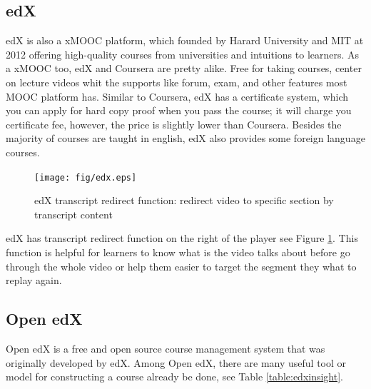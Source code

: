 \subsection{edX}
edX \cite{edx} is also a xMOOC platform, which founded by Harard University and MIT at 2012 offering high-quality courses from universities and intuitions to learners.
As a xMOOC too, edX and Coursera are pretty alike. Free for taking courses, center on lecture videos whit the supports like forum, exam, and other features most MOOC platform has.
Similar to Coursera, edX has a certificate system, which you can apply for hard copy proof when you pass the course; it will charge you certificate fee, however, the price is slightly lower than Coursera.
Besides the majority of courses are taught in english, edX also provides some foreign language courses.
\begin{figure}[H]
    \centering
    \texttt{[image: fig/edx.eps]}
    \caption{edX transcript redirect function: redirect video to specific section by transcript content}
    \label{fig:edx}
\end{figure}
edX has transcript redirect function on the right of the player see Figure \ref{fig:edx}.
This function is helpful for learners to know what is the video talks about before go through the whole video or help them easier to target the segment they what to replay again.

\subsection{Open edX}
Open edX is a free and open source course management system that was originally developed by edX.
Among Open edX, there are many useful tool or model for constructing a course already be done, see Table \ref{table:edxinsight}.

